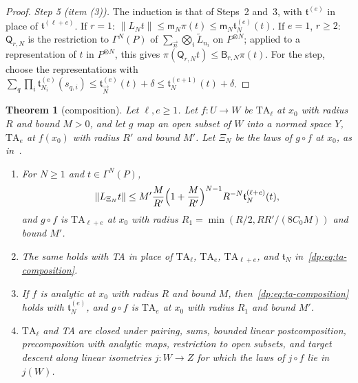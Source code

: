 \documentclass[11pt]{amsart}
\newtheorem{theorem}{Theorem}[section]
\theoremstyle{definition}
\theoremstyle{remark}
\numberwithin{equation}{section}
\newcommand{\norm}[1]{\lVert #1\rVert}
\theoremstyle{plain}
\theoremstyle{definition}
\theoremstyle{plain}
\begin{document}
\begin{proof}
\emph{Step 5 (item (3)).} The induction is that of Steps~2 and~3, with $\mathfrak t^{(e)}$ in place of $\mathfrak t^{(\ell+e)}$. If $r=1$: $\norm{L_Nt}\le\mathsf m_N\pi(t)\le\mathsf m_N\mathfrak t^{(e)}_N(t)$. If $e=1$, $r\ge2$: $\mathsf Q_{r,N}$ is the restriction to $\Gamma^N(P)$ of $\sum_{\vec n}\bigotimes_i\tilde L_{n_i}$ on $P^{\otimes N}$; applied to a representation of $t$ in $P^{\otimes N}$, this gives $\pi(\mathsf Q_{r,N}t)\le\mathsf B_{r,N}\pi(t)$. For the step, choose the representations with $\sum_q\prod_i\mathfrak t^{(e)}_{N_i}(s_{q,i})\le\mathfrak t^{(e)}_{\vec N}(t)+\delta\le\mathfrak t^{(e+1)}_N(t)+\delta$.
\end{proof}

\begin{theorem}[composition]\label{dp:thm:ta-composition}
Let $\ell,e\ge1$. Let $f\colon U\to W$ be $\mathrm{TA}_\ell$ at $x_0$ with radius $R$ and bound $M>0$, and let $g$ map an open subset of $W$ into a normed space $Y$, $\mathrm{TA}_e$ at $f(x_0)$ with radius $R'$ and bound $M'$. Let $\Xi_N$ be the laws of $g\circ f$ at $x_0$, as in~\cite[Lemma~Q.3]{I}.
\begin{enumerate}
\item For $N\ge1$ and $t\in\Gamma^N(P)$,
\begin{equation}\label{dp:eq:ta-composition}
 \norm{L_{\Xi_N}t}\le M'\frac M{R'}\Bigl(1+\frac M{R'}\Bigr)^{N-1}R^{-N}\mathfrak t^{(\ell+e)}_N(t),
\end{equation}
and $g\circ f$ is $\mathrm{TA}_{\ell+e}$ at $x_0$ with radius $R_1=\min(R/2,RR'/(8C_0M))$ and bound $M'$.
\item The same holds with TA in place of $\mathrm{TA}_\ell$, $\mathrm{TA}_e$, $\mathrm{TA}_{\ell+e}$, and $\mathfrak t_N$ in~\eqref{dp:eq:ta-composition}.
\item If $f$ is analytic at $x_0$ with radius $R$ and bound $M$, then~\eqref{dp:eq:ta-composition} holds with $\mathfrak t^{(e)}_N$, and $g\circ f$ is $\mathrm{TA}_e$ at $x_0$ with radius $R_1$ and bound $M'$.
\item $\mathrm{TA}_\ell$ and TA are closed under pairing, sums, bounded linear postcomposition, precomposition with analytic maps, restriction to open subsets, and target descent along linear isometries $j\colon W\to Z$ for which the laws of $j\circ f$ lie in $j(W)$.
\end{enumerate}
\end{theorem}
\end{document}
